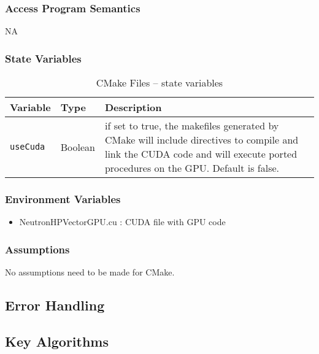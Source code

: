\documentclass[12pt]{article}
\begin{document}
\subsubsection{Access Program Semantics}%
NA

\subsubsection{State Variables}%
\begin{table}[h]
\caption{CMake Files -- state variables}\label{Table_CMakeStateVariables}
\begin{tabularx}{\textwidth}{p{}p{}p{}}
\toprule
\bf Variable & \bf Type & \bf Description\\\midrule
\texttt{useCuda} & Boolean & if set to true, the makefiles generated by CMake will include directives to compile and link the CUDA code and will execute ported procedures on the GPU. Default is false.\\
\bottomrule
\end{tabularx}
\end{table}

\subsubsection{Environment Variables}%
\begin{itemize}
\item NeutronHPVectorGPU.cu : CUDA file with GPU code
\end{itemize}


\subsubsection{Assumptions}%
No assumptions need to be made for CMake.

\subsection{Error Handling}

\subsection{Key Algorithms}
\end{document}
